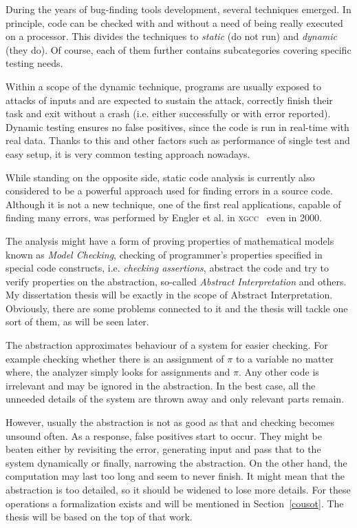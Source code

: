 \documentclass[11pt,a4paper]{article}
\begin{document}
During the years of bug-finding tools development, several techniques emerged.
In principle, code can be checked with and without a need of being really
executed on a processor. This divides the techniques to \emph{static} (do not
run) and \emph{dynamic} (they do). Of course, each of them further contains
subcategories covering specific testing needs.

Within a scope of the dynamic technique, programs are usually exposed to
attacks of inputs and are expected to sustain the attack, correctly finish
their task and exit without a crash (i.e. either successfully or with error
reported). Dynamic testing ensures no false positives, since the code is run
in real-time with real data. Thanks to this and other factors such as
performance of single test and easy setup, it is very common testing approach
nowadays.

While standing on the opposite side, static code analysis is currently also
considered to be a powerful approach used for finding errors in a source code.
Although it is not a new technique, one of the first real applications,
capable of finding many errors, was performed by Engler et al. in
\textsc{xgcc}~\cite{metal} even in 2000.

The analysis might have a form of proving properties of mathematical models
known as \emph{Model Checking}, checking of programmer's properties specified
in special code constructs, i.e. \emph{checking assertions}, abstract the code
and try to verify properties on the abstraction, so-called \emph{Abstract
Interpretation} and others. My dissertation thesis will be exactly in the
scope of Abstract Interpretation.  Obviously, there are some problems
connected to it and the thesis will tackle one sort of them, as will be seen
later.

The abstraction approximates behaviour of a system for easier checking. For
example checking whether there is an assignment of $\pi$ to a variable no
matter where, the analyzer simply looks for assignments and $\pi$. Any other
code is irrelevant and may be ignored in the abstraction. In the best case,
all the unneeded details of the system are thrown away and only relevant parts
remain.

However, usually the abstraction is not as good as that and checking becomes
unsound often. As a response, false positives start to occur. They might be
beaten either by revisiting the error, generating input and pass that to the
system dynamically or finally, narrowing the abstraction. On the other hand,
the computation may last too long and seem to never finish. It might mean
that the abstraction is too detailed, so it should be widened to lose more
details. For these operations a formalization exists and will be mentioned in
Section~\ref{cousot}. The thesis will be based on the top of that work.
\end{document}
